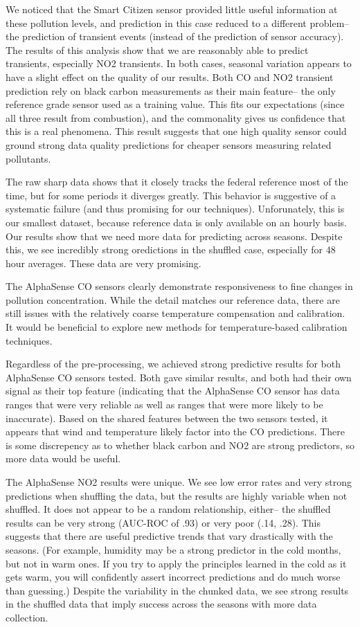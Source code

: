 We noticed that the Smart Citizen sensor provided little useful information at these pollution levels, and prediction in this case reduced to a different problem-- the prediction of transient events (instead of the prediction of sensor accuracy).  The results of this analysis show that we are reasonably able to predict transients, especially NO2 transients.  In both cases, seasonal variation appears to have a slight effect on the quality of our results.  Both CO and NO2 transient prediction rely on black carbon measurements as their main feature-- the only reference grade sensor used as a training value.  This fits our expectations (since all three result from combustion), and the commonality gives us confidence that this is a real phenomena.  This result suggests that one high quality sensor could ground strong data quality predictions for cheaper sensors measuring related pollutants.

The raw sharp data shows that it closely tracks the federal reference most of the time, but for some periods it diverges greatly.  This behavior is suggestive of a systematic failure (and thus promising for our techniques).  Unforunately, this is our smallest dataset, because reference data is only available on an hourly basis.  Our results show that we need more data for predicting across seasons.  Despite this, we see incredibly strong oredictions in the shuffled case, especially for 48 hour averages.  These data are very promising.

The AlphaSense CO sensors clearly demonstrate responsiveness to fine changes in pollution concentration.  While the detail matches our reference data, there are still issues with the relatively coarse temperature compensation and calibration.  It would be beneficial to explore new methods for temperature-based calibration techniques.  

Regardless of the pre-processing, we achieved strong predictive results for both AlphaSense CO sensors tested.  Both gave similar results, and both had their own signal as their top feature (indicating that the AlphaSense CO sensor has data ranges that were very reliable as well as ranges that were more likely to be inaccurate).  Based on the shared features between the two sensors tested, it appears that wind and temperature likely factor into the CO predictions.  There is some discrepency as to whether black carbon and NO2 are strong predictors, so more data would be useful.

The AlphaSense NO2 results were unique. We see low error rates and very strong predictions when shuffling the data, but the results are highly variable when not shuffled.  It does not appear to be a random relationship, either-- the shuffled results can be very strong (AUC-ROC of .93) or very poor (.14, .28).  This suggests that there are useful predictive trends that vary drastically with the seasons.  (For example, humidity may be a strong predictor in the cold months, but not in warm ones.  If you try to apply the principles learned in the cold as it gets warm, you will confidently assert incorrect predictions and do much worse than guessing.)  Despite the variability in the chunked data, we see strong results in the shuffled data that imply success across the seasons with more data collection.

